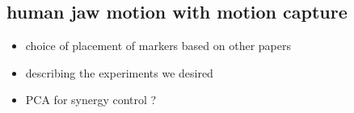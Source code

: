 \subsection{human jaw motion with motion capture}
\begin{itemize}
    \item choice of placement of markers based on other papers
    \item describing the experiments we desired
    \item PCA for synergy control ?
\end{itemize}




